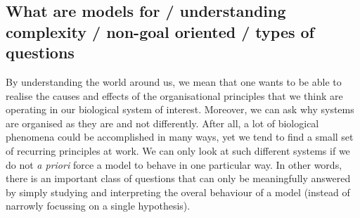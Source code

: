 \subsection{What are models for / understanding complexity / non-goal oriented / types of questions}

By understanding the world around us, we mean that one wants to be able to realise the causes and effects of the organisational principles that we think are operating in our biological system of interest. Moreover, we can ask why systems are organised as they are and not differently. After all, a lot of biological phenomena could be accomplished in many ways, yet we tend to find a small set of recurring principles at work. We can only look at such different systems if we do not \emph{a priori} force a model to behave in one particular way. In other words, there is an important class of questions that can only be meaningfully answered by simply studying and interpreting the overal behaviour of a model (instead of narrowly focussing on a single hypothesis).
  
  